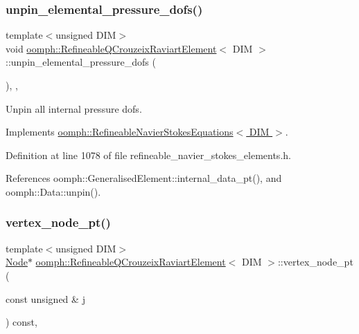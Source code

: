 \subsubsection{\texorpdfstring{unpin\+\_\+elemental\+\_\+pressure\+\_\+dofs()}{unpin\_elemental\_pressure\_dofs()}}
{\footnotesize\ttfamily template$<$unsigned D\+IM$>$ \\
void \hyperlink{classoomph_1_1RefineableQCrouzeixRaviartElement}{oomph\+::\+Refineable\+Q\+Crouzeix\+Raviart\+Element}$<$ D\+IM $>$\+::unpin\+\_\+elemental\+\_\+pressure\+\_\+dofs (\begin{DoxyParamCaption}{ }\end{DoxyParamCaption})\hspace{0.3cm}{\ttfamily [inline]}, {\ttfamily [private]}, {\ttfamily [virtual]}}



Unpin all internal pressure dofs. 



Implements \hyperlink{classoomph_1_1RefineableNavierStokesEquations_acd0b56b66d250625401a9f6578f8bebc}{oomph\+::\+Refineable\+Navier\+Stokes\+Equations$<$ D\+I\+M $>$}.



Definition at line 1078 of file refineable\+\_\+navier\+\_\+stokes\+\_\+elements.\+h.



References oomph\+::\+Generalised\+Element\+::internal\+\_\+data\+\_\+pt(), and oomph\+::\+Data\+::unpin().

\mbox{\label{classoomph_1_1RefineableQCrouzeixRaviartElement_a0065d45089ddd4c632da34e1eb9e2b63}} 
\subsubsection{\texorpdfstring{vertex\+\_\+node\+\_\+pt()}{vertex\_node\_pt()}}
{\footnotesize\ttfamily template$<$unsigned D\+IM$>$ \\
\hyperlink{classoomph_1_1Node}{Node}$\ast$ \hyperlink{classoomph_1_1RefineableQCrouzeixRaviartElement}{oomph\+::\+Refineable\+Q\+Crouzeix\+Raviart\+Element}$<$ D\+IM $>$\+::vertex\+\_\+node\+\_\+pt (\begin{DoxyParamCaption}\item[{const unsigned \&}]{j }\end{DoxyParamCaption}) const\hspace{0.3cm}{\ttfamily [inline]}, {\ttfamily [virtual]}}



